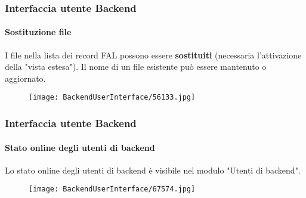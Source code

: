 \begin{frame}[fragile]
	\frametitle{Interfaccia utente Backend}
	\framesubtitle{Sostituzione file}

	I file nella lista dei record FAL possono essere \textbf{sostituiti} (necessaria l'attivazione della "vista estesa").
	Il nome di un file esistente può essere mantenuto o aggiornato.

	\begin{figure}
		\texttt{[image: BackendUserInterface/56133.jpg]}
	\end{figure}

\end{frame}

\begin{frame}[fragile]
	\frametitle{Interfaccia utente Backend}
	\framesubtitle{Stato online degli utenti di backend}

	Lo stato online degli utenti di backend è visibile nel modulo "Utenti di backend".

	\begin{figure}
		\texttt{[image: BackendUserInterface/67574.jpg]}
	\end{figure}

\end{frame}

